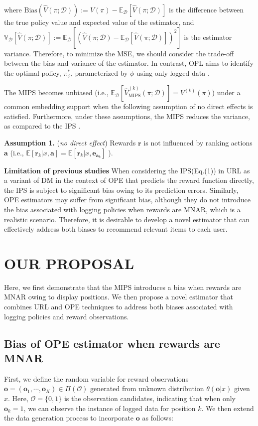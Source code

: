 \documentclass[a4paper,10pt]{article} %
\begin{document}
\begin{multicols}{2}
where \( \text{Bias}(\hat{V}(\pi;\mathcal{D})) := V(\pi) - \mathbb{E}_{\mathcal{D}}[\hat{V}(\pi;\mathcal{D})] \) is the difference between the true policy value and expected value of the estimator, and \( \mathbb{V}_{\mathcal{D}}[\hat{V}(\pi;\mathcal{D})] := \mathbb{E}_{\mathcal{D}}[(\hat{V}(\pi;\mathcal{D}) - \mathbb{E}_{\mathcal{D}}[\hat{V}(\pi;\mathcal{D})])^2] \) is the estimator variance. Therefore, to minimize the MSE, we should consider the trade-off between the bias and variance of the estimator. In contrast, OPL aims to identify the optimal policy, \( \pi_{\phi}^{*} \), parameterized by \( \phi \) using only logged data \cite{swaminathan2015counterfactual}.

The MIPS becomes unbiased (i.e., \( \mathbb{E}_{\mathcal{D}}[\hat{V}^{(k)}_{\text{MIPS}}(\pi;\mathcal{D})] = V^{(k)}(\pi) \)) under a common embedding support \cite{saito2022off} when the following assumption of no direct effects is satisfied. Furthermore, under these assumptions, the MIPS reduces the variance, as compared to the IPS \cite{saito2022off}.

\textbf{Assumption 1.} (\textit{no direct effect}) Rewards \( \boldsymbol{r} \) is not influenced by ranking actions \( \boldsymbol{a} \) (i.e., \( \mathbb{E}[\boldsymbol{r}_k|x,\boldsymbol{a}] = \mathbb{E}[\boldsymbol{r}_k|x,\boldsymbol{e}_{\boldsymbol{a}_k}] \) ).

\textbf{Limitation of previous studies} When considering the IPS(Eq.(1)) in URL as a variant of DM in the context of OPE that predicts the reward function directly, the IPS is subject to significant bias owing to its prediction errors. Similarly, OPE estimators may suffer from significant bias, although they do not introduce the bias associated with logging policies when rewards are MNAR, which is a realistic scenario. Therefore, it is desirable to develop a novel estimator that can effectively address both biases to recommend relevant items to each user.

\section{OUR PROPOSAL}
Here, we first demonstrate that the MIPS introduces a bias when rewards are MNAR owing to display positions. We then propose a novel estimator that combines URL and OPE techniques to address both biases associated with logging policies and reward observations. 

\subsection{Bias of OPE estimator when rewards are MNAR}
First, we define the random variable for reward observations \( \boldsymbol{o} = (\boldsymbol{o}_1, \cdots, \boldsymbol{o}_K ) \in \Pi(\mathcal{O}) \) generated from unknown distribution \( \theta(\boldsymbol{o}|x) \) given \( x \). Here, \( \mathcal{O} = \{ 0, 1 \} \) is the observation candidates, indicating that when only \( \boldsymbol{o}_k = 1 \), we can observe the instance of logged data for position \( k \). We then extend the data generation process to incorporate \( \boldsymbol{o} \) as follows:


\end{multicols}
\end{document}
